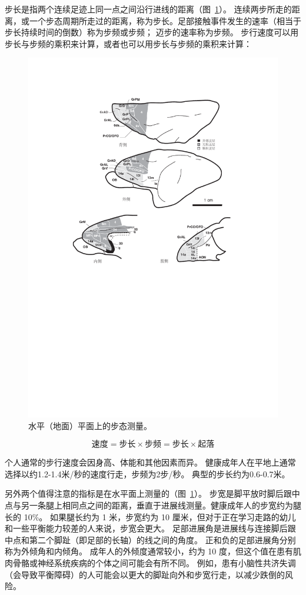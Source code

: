 步长是指两个连续足迹上同一点之间沿行进线的距离（图~\ref{fig:2_3}）。
连续两步所走的距离，或一个步态周期所走过的距离，称为步长。足部接触事件发生的速率（相当于步长持续时间的倒数）称为步频或步频；
迈步的速率称为步频。
步行速度可以用步长与步频的乘积来计算，或者也可以用步长与步频的乘积来计算：


\begin{figure}[!htb]
	\centering
	\includegraphics[width=0.8\linewidth]{chap2/2_3}
	\caption{水平（地面）平面上的步态测量。 \label{fig:2_3}}
\end{figure}

\begin{equation}
	\text{速度} = \text{步长} \times \text{步频}
			    = \text{步长} \times \text{起落}
\end{equation}

个人通常的步行速度会因身高、体能和其他因素而异。
健康成年人在平地上通常选择以约1.2-1.4米/秒的速度行走，步频为2步/秒。
典型的步长约为0.6-0.7米。


另外两个值得注意的指标是在水平面上测量的（图~\ref{fig:2_3}）。
步宽是脚平放时脚后跟中点与另一条腿上相同点之间的距离，垂直于进展线测量。健康成年人的步宽约为腿长的 10\%。
如果腿长约为 1 米，步宽约为 10 厘米，但对于正在学习走路的幼儿和一些平衡能力较差的人来说，步宽会更大。
足部进展角是进展线与连接脚后跟中点和第二个脚趾（即足部的长轴）的线之间的角度。
正和负的足部进展角分别称为外倾角和内倾角。
成年人的外倾度通常较小，约为 10 度，但这个值在患有肌肉骨骼或神经系统疾病的个体之间可能会有所不同。
例如，患有小脑性共济失调（会导致平衡障碍）的人可能会以更大的脚趾向外和步宽行走，以减少跌倒的风险。


